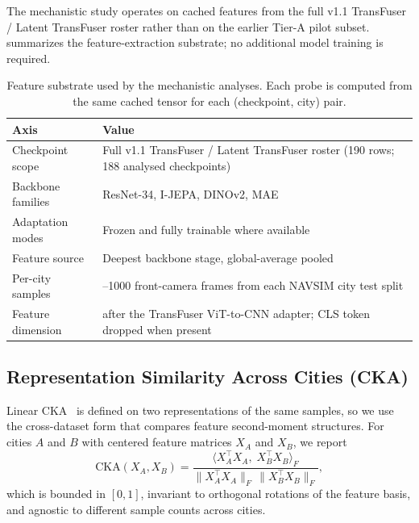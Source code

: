 The mechanistic study operates on cached features from the full v1.1 TransFuser / Latent TransFuser roster rather than on the earlier Tier-A pilot subset.  summarizes the feature-extraction substrate; no additional model training is required.

\begin{table}[ht]
\centering
\caption[Feature cache for the mechanistic analyses.]{Feature substrate used by the mechanistic analyses. Each probe is computed from the same cached tensor for each (checkpoint, city) pair.}
\label{tab:exp-mech-feature-cache}
\small
\renewcommand{\arraystretch}{1.15}
\setlength{\tabcolsep}{6pt}
\begin{tabular}{@{}>{\raggedright\arraybackslash}p{4.2cm} >{\raggedright\arraybackslash}p{7.8cm}@{}}
\toprule
\textbf{Axis} & \textbf{Value} \\
\midrule
Checkpoint scope & Full v1.1 TransFuser / Latent TransFuser roster (190 rows; 188 analysed checkpoints) \\
Backbone families & ResNet-34, I-JEPA, DINOv2, MAE \\
Adaptation modes & Frozen and fully trainable where available \\
Feature source & Deepest backbone stage, global-average pooled \\
Per-city samples & 556--1000 front-camera frames from each NAVSIM city test split \\
Feature dimension & 512 after the TransFuser ViT-to-CNN adapter; CLS token dropped when present \\
\bottomrule
\end{tabular}
\end{table}

\subsection{Representation Similarity Across Cities (CKA)}
\label{sec:exp-cka}

Linear CKA~\cite{kornblith-cka-2019} is defined on two representations of the same samples, so we use the cross-dataset form that compares feature second-moment structures. For cities $A$ and $B$ with centered feature matrices $X_A$ and $X_B$, we report
\begin{equation}
\mathrm{CKA}(X_A, X_B)
=
\frac{\langle X_A^\top X_A,\; X_B^\top X_B \rangle_F}
     {\lVert X_A^\top X_A \rVert_F \,\lVert X_B^\top X_B \rVert_F},
\end{equation}
which is bounded in $[0, 1]$, invariant to orthogonal rotations of the feature basis, and agnostic to different sample counts across cities.

